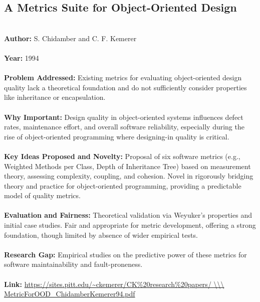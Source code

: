 \documentclass[12pt]{article}
\begin{document}
\subsection*{A Metrics Suite for Object-Oriented Design}
\\
\textbf{Author:} S. Chidamber and C. F. Kemerer \\
\\
\textbf{Year:} 1994 \\
\\
\textbf{Problem Addressed:} Existing metrics for evaluating object-oriented design quality lack a theoretical foundation and do not sufficiently consider properties like inheritance or encapsulation. \\
\\
\textbf{Why Important:} Design quality in object-oriented systems influences defect rates, maintenance effort, and overall software reliability, especially during the rise of object-oriented programming where designing-in quality is critical. \\
\\
\textbf{Key Ideas Proposed and Novelty:} Proposal of six software metrics (e.g., Weighted Methods per Class, Depth of Inheritance Tree) based on measurement theory, assessing complexity, coupling, and cohesion. Novel in rigorously bridging theory and practice for object-oriented programming, providing a predictable model of quality metrics. \\
\\
\textbf{Evaluation and Fairness:} Theoretical validation via Weyuker's properties and initial case studies. Fair and appropriate for metric development, offering a strong foundation, though limited by absence of wider empirical tests. \\
\\
\textbf{Research Gap:} Empirical studies on the predictive power of these metrics for software maintainability and fault-proneness. \\
\\
\textbf{Link:} \url{https://sites.pitt.edu/~ckemerer/CK%
MetricForOOD_ChidamberKemerer94.pdf}
\pagebreak


\end{document}
